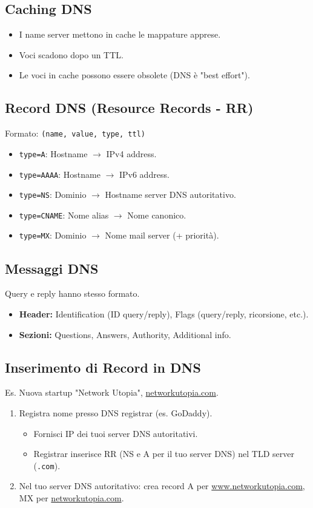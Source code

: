 \subsection{Caching DNS}
\begin{itemize}
    \item I name server mettono in cache le mappature apprese.
    \item Voci scadono dopo un TTL.
    \item Le voci in cache possono essere obsolete (DNS è "best effort").
\end{itemize}

\subsection{Record DNS (Resource Records - RR)}
Formato: \texttt{(name, value, type, ttl)}
\begin{itemize}
    \item \texttt{type=A}: Hostname $\rightarrow$ IPv4 address.
    \item \texttt{type=AAAA}: Hostname $\rightarrow$ IPv6 address.
    \item \texttt{type=NS}: Dominio $\rightarrow$ Hostname server DNS autoritativo.
    \item \texttt{type=CNAME}: Nome alias $\rightarrow$ Nome canonico.
    \item \texttt{type=MX}: Dominio $\rightarrow$ Nome mail server (+ priorità).
\end{itemize}

\subsection{Messaggi DNS}
Query e reply hanno stesso formato.
\begin{itemize}
    \item \textbf{Header:} Identification (ID query/reply), Flags (query/reply, ricorsione, etc.).
    \item \textbf{Sezioni:} Questions, Answers, Authority, Additional info.
\end{itemize}

\subsection{Inserimento di Record in DNS}
Es. Nuova startup "Network Utopia", \url{networkutopia.com}.
\begin{enumerate}
    \item Registra nome presso DNS registrar (es. GoDaddy).
    \begin{itemize}
        \item Fornisci IP dei tuoi server DNS autoritativi.
        \item Registrar inserisce RR (NS e A per il tuo server DNS) nel TLD server (\texttt{.com}).
    \end{itemize}
    \item Nel tuo server DNS autoritativo: crea record A per \url{www.networkutopia.com}, MX per \url{networkutopia.com}.
\end{enumerate}

